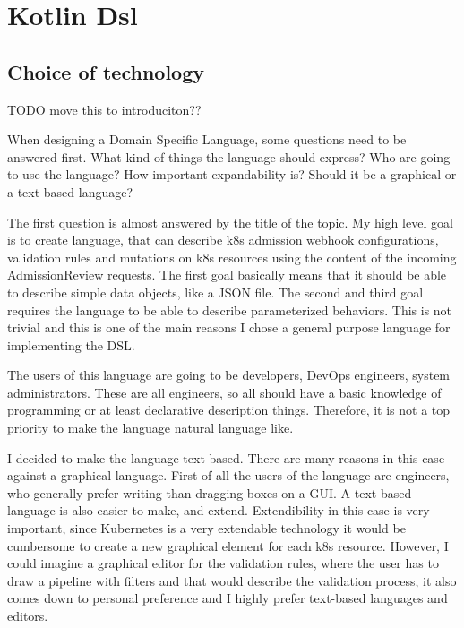 \setlength{\parindent}{0pt}
\setlength{\parskip}{0.6em}

\chapter{Kotlin Dsl}
\label{chap:dsl}

\section{Choice of technology}

TODO move this to introduciton??

When designing a Domain Specific Language, some questions need to be answered first. What kind of things the language should express? Who are going to use the language? How important expandability is? Should it be a graphical or a text-based language?

The first question is almost answered by the title of the topic. My high level goal is to create language, that can describe k8s admission webhook configurations, validation rules and mutations on k8s resources using the content of the incoming AdmissionReview requests. The first goal basically means that it should be able to describe simple data objects, like a JSON file. The second and third goal requires the language to be able to describe parameterized behaviors. This is not trivial and this is one of the main reasons I chose a general purpose language for implementing the DSL.

The users of this language are going to be developers, DevOps engineers, system administrators. These are all engineers, so all should have a basic knowledge of programming or at least declarative description things. Therefore, it is not a top priority to make the language natural language like.

I decided to make the language text-based. There are many reasons in this case against a graphical language. First of all the users of the language are engineers, who generally prefer writing than dragging boxes on a GUI. A text-based language is also easier to make, and extend. Extendibility in this case is very important, since Kubernetes is a very extendable technology it would be cumbersome to create a new graphical element for each k8s resource. However, I could imagine a graphical editor for the validation rules, where the user has to draw a pipeline with filters and that would describe the validation process, it also comes down to personal preference and I highly prefer text-based languages and editors.

